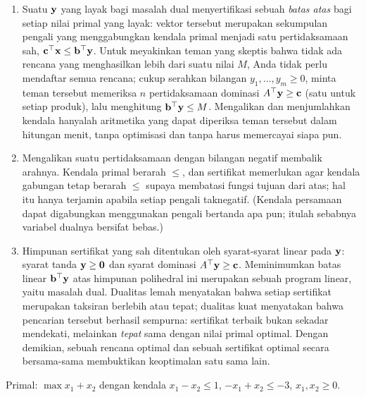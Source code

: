 \begin{enumerate}
\item Suatu $\mathbf{y}$ yang layak bagi masalah dual menyertifikasi sebuah \emph{batas atas} bagi setiap nilai primal yang layak: vektor tersebut merupakan sekumpulan pengali yang menggabungkan kendala primal menjadi satu pertidaksamaan sah, $\mathbf{c}^\top\mathbf{x} \le \mathbf{b}^\top\mathbf{y}$. Untuk meyakinkan teman yang skeptis bahwa tidak ada rencana yang menghasilkan lebih dari suatu nilai $M$, Anda tidak perlu mendaftar semua rencana; cukup serahkan bilangan $y_1, \dots, y_m \ge 0$, minta teman tersebut memeriksa $n$ pertidaksamaan dominasi $A^\top\mathbf{y} \ge \mathbf{c}$ (satu untuk setiap produk), lalu menghitung $\mathbf{b}^\top\mathbf{y} \le M$. Mengalikan dan menjumlahkan kendala hanyalah aritmetika yang dapat diperiksa teman tersebut dalam hitungan menit, tanpa optimisasi dan tanpa harus memercayai siapa pun.
\item Mengalikan suatu pertidaksamaan dengan bilangan negatif membalik arahnya. Kendala primal berarah $\leq$, dan sertifikat memerlukan agar kendala gabungan tetap berarah $\leq$ supaya membatasi fungsi tujuan dari atas; hal itu hanya terjamin apabila setiap pengali taknegatif. (Kendala persamaan dapat digabungkan menggunakan pengali bertanda apa pun; itulah sebabnya variabel dualnya bersifat bebas.)
\item Himpunan sertifikat yang sah ditentukan oleh syarat-syarat linear pada $\mathbf{y}$: syarat tanda $\mathbf{y} \ge \mathbf{0}$ dan syarat dominasi $A^\top\mathbf{y} \ge \mathbf{c}$. Meminimumkan batas linear $\mathbf{b}^\top\mathbf{y}$ atas himpunan polihedral ini merupakan sebuah program linear, yaitu masalah dual. Dualitas lemah menyatakan bahwa setiap sertifikat merupakan taksiran berlebih atau tepat; dualitas kuat menyatakan bahwa pencarian tersebut berhasil sempurna: sertifikat terbaik bukan sekadar mendekati, melainkan \emph{tepat} sama dengan nilai primal optimal. Dengan demikian, sebuah rencana optimal dan sebuah sertifikat optimal secara bersama-sama membuktikan keoptimalan satu sama lain.
\end{enumerate}


Primal: $\max x_1 + x_2$ dengan kendala $x_1 - x_2 \le 1$, $-x_1 + x_2 \le -3$, $x_1, x_2 \ge 0$.

